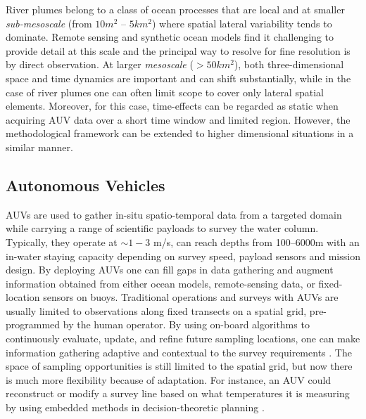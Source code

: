 \documentclass[aoas]{imsart}
\begin{document}


River plumes belong to a class of ocean processes that are local and
at smaller \emph{sub-mesoscale} (from $10 m^2$ -- $5 km^2$) where
spatial lateral variability tends to dominate. Remote sensing and
synthetic ocean models find it challenging to provide detail at this
scale \citep{Lermusiaux:2006} and the principal way to resolve for
fine resolution is by direct observation. At larger \emph{mesoscale}
($>50 km^2$), both three-dimensional space and time dynamics are
important and can shift substantially, while in the case of river
plumes one can often limit scope to cover only lateral spatial
elements. Moreover, for this case, time-effects can be regarded as
static when acquiring AUV data over a short time window and limited
region. However, the methodological framework can be extended to
higher dimensional situations in a similar manner.

\subsection{Autonomous Vehicles}

AUVs are used to gather in-situ spatio-temporal data from a targeted
domain while carrying a range of scientific payloads to survey the
water column.  Typically, they operate at $\sim 1-3$ m/s, can reach
depths from 100--6000m with an in-water staying capacity depending on
survey speed, payload sensors and mission design. By deploying AUVs
one can fill gaps in data gathering and augment information obtained
from either ocean models, remote-sensing data, or fixed-location
sensors on buoys. Traditional operations and surveys with AUVs are
usually limited to observations along fixed transects on a spatial
grid, pre-programmed by the human operator.  By using on-board
algorithms to continuously evaluate, update, and refine future
sampling locations, one can make information gathering adaptive and
contextual to the survey requirements
\citep{das11b,fossuminformation,fossum18b}.  The space of sampling
opportunities is still limited to the spatial grid, but now there is
much more flexibility because of adaptation.  For instance, an AUV
could reconstruct or modify a survey line based on what temperatures
it is measuring by using embedded methods in decision-theoretic
planning \citep{py10,Rajan12,Rajan12b}.
\end{document}
